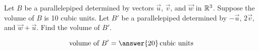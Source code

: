 \documentclass{ximera}
\author{}
\begin{document}
\begin{exercise}
Let $B$ be a parallelepiped determined by vectors $\vec{u}$, $\vec{v}$, and $\vec{w}$ in $\mathbb{R}^3$.  Suppose the volume of $B$ is 10 cubic units.  Let $B'$ be a parallelepiped determined by $-\vec{u}$, $2\vec{v}$, and $\vec{w}+\vec{u}$.  Find the volume of $B'$.

$$\text{volume of }B' = \answer{20}\,\text{cubic units}$$


 \end{exercise}
 
\end{document}
